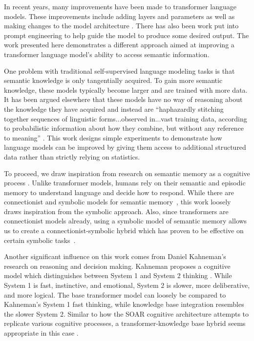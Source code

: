 \documentclass[phd,electronic,oneside,twosidetoc,letterpaper,chaptercenter,parttop,lof]{byumsphd}
\begin{document}
In recent years, many improvements have been made to transformer language models.
These improvements include adding layers and parameters \cite{brown2020language} as well as making changes to the model architecture \cite{devlin2018bert}.
There has also been work put into prompt engineering \cite{zhang2021differentiable} to help guide the model to produce some desired output.
The work presented here demonstrates a different approach aimed at improving a transformer language model's ability to access semantic information.

One problem with traditional self-supervised language modeling tasks is that semantic knowledge is only tangentially acquired.
To gain more semantic knowledge, these models typically become larger and are trained with more data.
It has been argued elsewhere that these models have no way of reasoning about the knowledge they have acquired and instead are ``haphazardly stitching together sequences of linguistic forms...observed in...vast training data, according to probabilistic information about how they combine, but without any reference to meaning'' \cite{bender2021dangers}.
This work designs simple experiments to demonstrate how language models can be improved by giving them access to additional structured data rather than strictly relying on statistics.

To proceed, we draw inspiration from research on semantic memory as a cognitive process \cite{tulving1972episodic}. 
Unlike transformer models, humans rely on their semantic and episodic memory to understand language and decide how to respond.
While there are connectionist and symbolic models for semantic memory~\cite{jones2015models}, this work loosely draws inspiration from the symbolic approach.
Also, since transformers are connectionist models already, using a symbolic model of semantic memory allows us to create a connectionist-symbolic hybrid which has proven to be effective on certain symbolic tasks~\cite{mao2019neuro}.

Another significant influence on this work comes from Daniel Kahneman's research on reasoning and decision making.
Kahneman proposes a cognitive model which distinguishes between System 1 and System 2 thinking \cite{kahneman2011thinking}. While System 1 is fast, instinctive, and emotional, System 2 is slower, more deliberative, and more logical. 
The base transformer model can loosely be compared to Kahneman's System 1 fast thinking, while knowledge base integration resembles the slower System 2.
Similar to how the SOAR cognitive architecture attempts to replicate various cognitive processes, a transformer-knowledge base hybrid seems appropriate in this case \cite{laird2012soar}.
\end{document}

